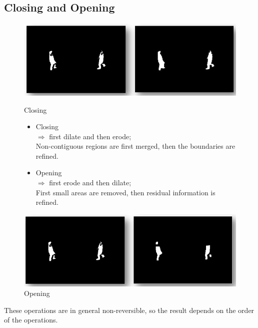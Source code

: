 \subsection{Closing and Opening}
\begin{figure}[H]
    \centering
    \begin{minipage}[b]{0.45\textwidth}
        \includegraphics[scale=0.3]{Figures/Closing.png}
        \caption{Closing}
    \end{minipage}
    \begin{minipage}[b]{0.45\textwidth}
        \begin{itemize}
            \item Closing \\ $\Rightarrow$ first dilate and then erode; \\ Non-contiguous regions are first merged, then the boundaries are refined.
        \end{itemize}
    \end{minipage}
    
    \vspace{1cm} 
    
    \begin{minipage}[b]{0.45\textwidth}
        \begin{itemize}
            \item Opening \\ $\Rightarrow$ first erode and then dilate; \\ First small areas are removed, then residual information is refined.
        \end{itemize}
    \end{minipage}
    \begin{minipage}[b]{0.45\textwidth}
        \includegraphics[scale=0.3]{Figures/Opening.png}
        \caption{Opening}
    \end{minipage}
\end{figure}

These operations are in general non-reversible, so the result depends on the order of the operations.
